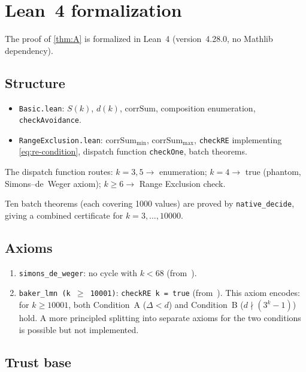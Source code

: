 \documentclass[11pt, a4paper]{amsart}
\theoremstyle{plain}
\theoremstyle{definition}
\theoremstyle{remark}
\newcommand{\corrSum}{\mathrm{corrSum}}
\begin{document}
\section{Lean~4 formalization}\label{sec:lean}

The proof of \cref{thm:A} is formalized in Lean~4
(version~4.28.0, no Mathlib dependency).

\subsection{Structure}

\begin{itemize}
  \item \texttt{Basic.lean}: $S(k)$, $d(k)$, $\corrSum$,
    composition enumeration, \texttt{checkAvoidance}.
  \item \texttt{RangeExclusion.lean}: $\corrSum_{\min}$,
    $\corrSum_{\max}$, \texttt{checkRE} implementing
    \eqref{eq:re-condition}, dispatch function
    \texttt{checkOne}, batch theorems.
\end{itemize}

The dispatch function routes:
$k = 3, 5 \to$ enumeration;
$k = 4 \to$ true (phantom, Simons--de~Weger axiom);
$k \geq 6 \to$ Range Exclusion check.

Ten batch theorems (each covering 1000 values) are proved
by \texttt{native\_decide}, giving a combined certificate
for $k = 3, \ldots, 10000$.

\subsection{Axioms}

\begin{enumerate}
  \item \texttt{simons\_de\_weger}: no cycle with $k < 68$
    (from~\cite{SimonsDeWeger2005}).
  \item \texttt{baker\_lmn (k $\geq$ 10001)}: \texttt{checkRE k = true}
    (from~\cite{LMN1995}).  This axiom encodes: for
    $k \geq 10001$, both Condition~A ($\Delta < d$) and
    Condition~B ($d \nmid (3^k-1)$) hold.  A more principled
    splitting into separate axioms for the two conditions is
    possible but not implemented.
\end{enumerate}

\subsection{Trust base}
\end{document}
